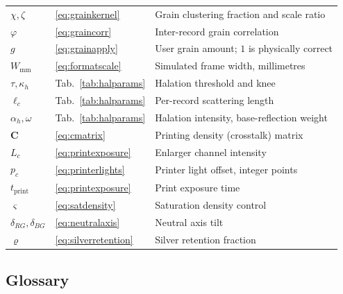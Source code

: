 \begin{table}[htbp]
\begin{center}
\begin{tabularx}{\columnwidth}{@{}ll>{\raggedright\arraybackslash}X@{}}
$\chi, \zeta$ & \eqref{eq:grainkernel} & Grain clustering fraction and scale ratio \\
$\varphi$ & \eqref{eq:graincorr} & Inter-record grain correlation \\
$g$ & \eqref{eq:grainapply} & User grain amount; $1$ is physically correct \\
$W_{\mathrm{mm}}$ & \eqref{eq:formatscale} & Simulated frame width, millimetres \\
$\tau, \kappa_h$ & Tab.~\ref{tab:halparams} & Halation threshold and knee \\
$\ell_c$ & Tab.~\ref{tab:halparams} & Per-record scattering length \\
$\alpha_h, \omega$ & Tab.~\ref{tab:halparams} & Halation intensity, base-reflection weight \\
$\mathbf{C}$ & \eqref{eq:cmatrix} & Printing density (crosstalk) matrix \\
$L_c$ & \eqref{eq:printexposure} & Enlarger channel intensity \\
$p_c$ & \eqref{eq:printerlights} & Printer light offset, integer points \\
$t_{\mathrm{print}}$ & \eqref{eq:printexposure} & Print exposure time \\
$\varsigma$ & \eqref{eq:satdensity} & Saturation density control \\
$\delta_{RG}, \delta_{BG}$ & \eqref{eq:neutralaxis} & Neutral axis tilt \\
$\varrho$ & \eqref{eq:silverretention} & Silver retention fraction \\
\bottomrule
\end{tabularx}
\end{center}
\end{table}

\subsection{Glossary}

